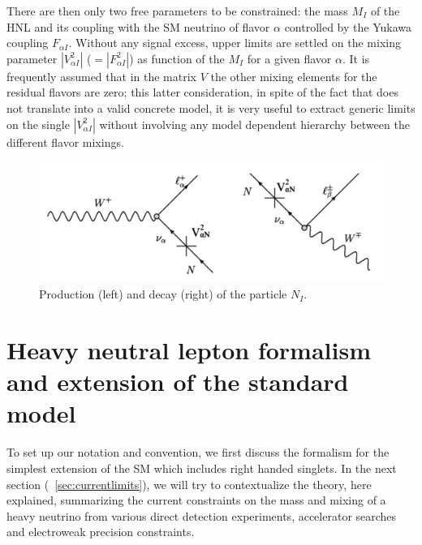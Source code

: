 There are then only two free parameters to be constrained: the mass $M_I$ of the HNL and its coupling with the SM neutrino of flavor $\alpha$ controlled by the Yukawa coupling $F_{\alpha I}$. Without any signal excess, upper limits are settled on the mixing parameter $|V^2_{\alpha I}|$ ($= |F^2_{\alpha I}|$) as function of the $M_I$ for a given flavor $\alpha$. It is frequently assumed that in the matrix $V$ the other mixing elements for the residual flavors are zero; this latter consideration, in spite of the fact that does not translate into a valid concrete model, it is very useful to extract generic limits on the single $|V^2_{\alpha I}|$ without involving any model dependent hierarchy between the different flavor mixings. 
\begin{figure}[h]
  \centering
  \includegraphics[width=.80\textwidth]{Figures/c3/diagram_decay}
    \caption{Production (left) and decay (right) of the particle $N_{I}$.}
  \label{fig:c3diagram_decay}
\end{figure}

\section{Heavy neutral lepton formalism and extension of the standard model}
To set up our notation and convention, we first discuss the formalism for the simplest
extension of the SM which includes right handed singlets. In the next section (~\ref{sec:currentlimits}), we will try to contextualize the theory, here explained, summarizing the current constraints on the mass and mixing of a heavy neutrino from various direct
detection experiments, accelerator searches and electroweak precision constraints.
